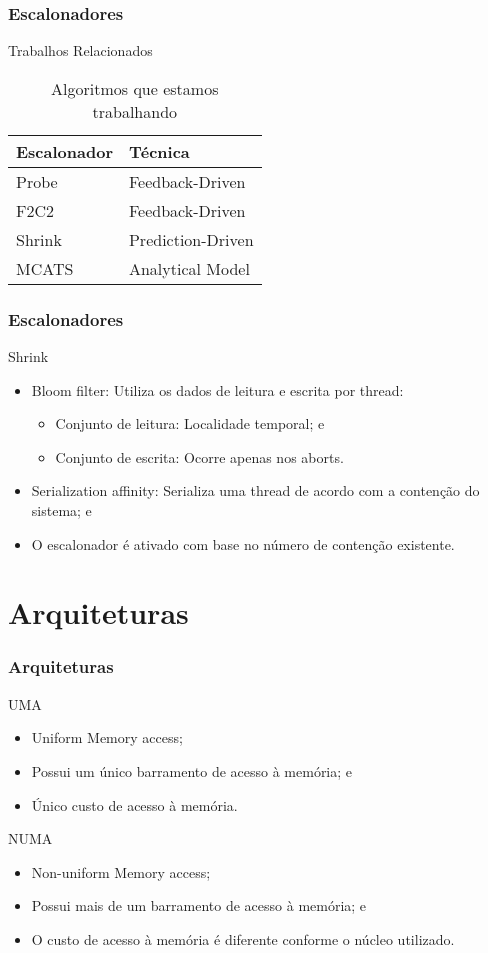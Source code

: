 \documentclass[10pt, pdf,xcolor=pdftex,dvipsnames,table]{beamer}
\begin{document}
\begin{frame} \frametitle{Escalonadores}
\begin{block}{Trabalhos Relacionados}
\begin{table}[]
\footnotesize
\centering
\caption{Algoritmos que estamos trabalhando}
\label{tab:compare}
\begin{tabular}{l|l}
\hline
Escalonador & Técnica \\ \hline
Probe & Feedback-Driven \\
F2C2 & Feedback-Driven \\
Shrink & Prediction-Driven  \\
MCATS & Analytical Model \\
\hline
\end{tabular}
\end{table}
\end{block}
\end{frame}

\begin{frame} \frametitle{Escalonadores}
\begin{block}{Shrink}
\begin{itemize}
    \item Bloom filter: Utiliza os dados de leitura e escrita por thread:
    \begin{itemize}
        \item Conjunto de leitura: Localidade temporal; e
        \item Conjunto de escrita: Ocorre apenas nos aborts.
    \end{itemize}
    \item Serialization affinity: Serializa uma thread de acordo com a contenção do sistema; e
    \item O escalonador é ativado com base no número de contenção existente.
\end{itemize}
\end{block}
\end{frame}

\section{Arquiteturas}
\begin{frame} \frametitle{Arquiteturas}
\begin{block}{UMA}
\begin{itemize}
	\item Uniform Memory access;
	\item Possui um único barramento de acesso à memória; e
	\item Único custo de acesso à memória.
\end{itemize}
\end{block}
\begin{block}{NUMA}
\begin{itemize}
	\item Non-uniform Memory access;
	\item Possui mais de um barramento de acesso à memória; e
	\item O custo de acesso à memória é diferente conforme o núcleo utilizado.
\end{itemize}
\end{block}
\end{frame}
\end{document}

